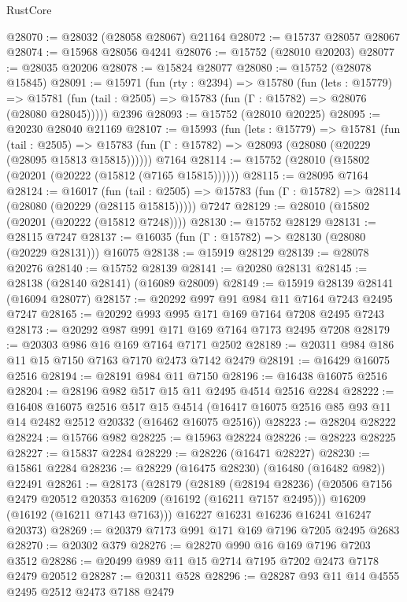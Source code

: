 \begin{lexlean}{RustCore}
\begin{coremodule}
@28070 := @28032 (@28058 @28067) @21164
@28072 := @15737 @28057 @28067
@28074 := @15968 @28056 @4241
@28076 := @15752 (@28010 @20203)
@28077 := @28035 @20206
@28078 := @15824 @28077
@28080 := @15752 (@28078 @15845)
@28091 := @15971
    (fun (rty : @2394) =>
    @15780
      (fun (lets : @15779) =>
      @15781 (fun (tail : @2505) => @15783 (fun (Γ : @15782) => @28076 (@28080 @28045)))))
    @2396
@28093 := @15752 (@28010 @20225)
@28095 := @20230 @28040 @21169
@28107 := @15993
    (fun (lets : @15779) =>
    @15781
      (fun (tail : @2505) =>
      @15783 (fun (Γ : @15782) => @28093 (@28080 (@20229 (@28095 @15813 @15815))))))
    @7164
@28114 := @15752 (@28010 (@15802 (@20201 (@20222 (@15812 (@7165 @15815))))))
@28115 := @28095 @7164
@28124 := @16017
    (fun (tail : @2505) => @15783 (fun (Γ : @15782) => @28114 (@28080 (@20229 (@28115 @15815)))))
    @7247
@28129 := @28010 (@15802 (@20201 (@20222 (@15812 @7248))))
@28130 := @15752 @28129
@28131 := @28115 @7247
@28137 := @16035 (fun (Γ : @15782) => @28130 (@28080 (@20229 @28131))) @16075
@28138 := @15919 @28129
@28139 := @28078 @20276
@28140 := @15752 @28139
@28141 := @20280 @28131
@28145 := @28138 (@28140 @28141) (@16089 @28009)
@28149 := @15919 @28139 @28141 (@16094 @28077)
@28157 := @20292 @997 @91 @984 @11 @7164 @7243 @2495 @7247
@28165 := @20292 @993 @995 @171 @169 @7164 @7208 @2495 @7243
@28173 := @20292 @987 @991 @171 @169 @7164 @7173 @2495 @7208
@28179 := @20303 @986 @16 @169 @7164 @7171 @2502
@28189 := @20311 @984 @186 @11 @15 @7150 @7163 @7170 @2473 @7142 @2479
@28191 := @16429 @16075 @2516
@28194 := @28191 @984 @11 @7150
@28196 := @16438 @16075 @2516
@28204 := @28196 @982 @517 @15 @11 @2495 @4514 @2516 @2284
@28222 := @16408
    @16075
    @2516
    @517
    @15
    @4514
    (@16417 @16075 @2516 @85 @93 @11 @14 @2482 @2512 @20332 (@16462 @16075 @2516))
@28223 := @28204 @28222
@28224 := @15766 @982
@28225 := @15963 @28224
@28226 := @28223 @28225
@28227 := @15837 @2284
@28229 := @28226 (@16471 @28227)
@28230 := @15861 @2284
@28236 := @28229 (@16475 @28230) (@16480 (@16482 @982)) @22491
@28261 := @28173
    (@28179
      (@28189
        (@28194 @28236)
        (@20506 @7156 @2479 @20512 @20353 @16209 (@16192 (@16211 @7157 @2495)))
        @16209
        (@16192 (@16211 @7143 @7163)))
      @16227
      @16231
      @16236
      @16241
      @16247
      @20373)
@28269 := @20379 @7173 @991 @171 @169 @7196 @7205 @2495 @2683
@28270 := @20302 @379
@28276 := @28270 @990 @16 @169 @7196 @7203 @3512
@28286 := @20499 @989 @11 @15 @2714 @7195 @7202 @2473 @7178 @2479 @20512
@28287 := @20311 @528
@28296 := @28287 @93 @11 @14 @4555 @2495 @2512 @2473 @7188 @2479

\end{coremodule}
\end{lexlean}
